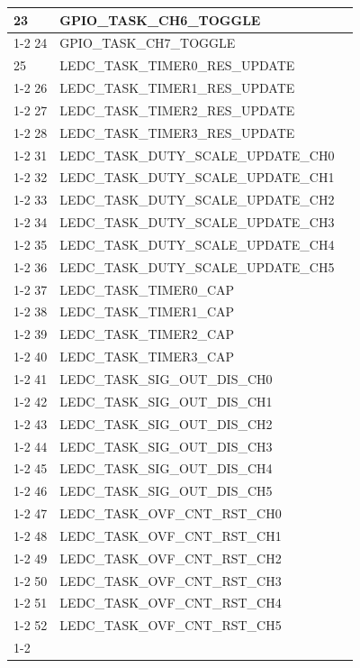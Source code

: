 \documentclass[main\_\_EN.tex]{subfiles}
\begin{document}
\begin{longtable}{ | l | l | l | }
23  & GPIO\_TASK\_CH6\_TOGGLE  &  \\ \cline{1-2}
24  & GPIO\_TASK\_CH7\_TOGGLE  &  \\ \hline
25  & LEDC\_TASK\_TIMER0\_RES\_UPDATE      & \nameref{mod:ledpwm} \\ \cline{1-2}
26  & LEDC\_TASK\_TIMER1\_RES\_UPDATE      & \\ \cline{1-2}
27  & LEDC\_TASK\_TIMER2\_RES\_UPDATE      & \\ \cline{1-2}
28  & LEDC\_TASK\_TIMER3\_RES\_UPDATE      & \\ \cline{1-2}
31  & LEDC\_TASK\_DUTY\_SCALE\_UPDATE\_CH0 & \\ \cline{1-2}
32  & LEDC\_TASK\_DUTY\_SCALE\_UPDATE\_CH1 & \\ \cline{1-2}
33  & LEDC\_TASK\_DUTY\_SCALE\_UPDATE\_CH2 & \\ \cline{1-2}
34  & LEDC\_TASK\_DUTY\_SCALE\_UPDATE\_CH3 & \\ \cline{1-2}
35  & LEDC\_TASK\_DUTY\_SCALE\_UPDATE\_CH4 & \\ \cline{1-2}
36  & LEDC\_TASK\_DUTY\_SCALE\_UPDATE\_CH5 & \\ \cline{1-2}
37  & LEDC\_TASK\_TIMER0\_CAP  & \\ \cline{1-2}
38  & LEDC\_TASK\_TIMER1\_CAP  & \\ \cline{1-2}
39  & LEDC\_TASK\_TIMER2\_CAP  & \\ \cline{1-2}
40  & LEDC\_TASK\_TIMER3\_CAP  & \\ \cline{1-2}
41  & LEDC\_TASK\_SIG\_OUT\_DIS\_CH0& \\ \cline{1-2}
42  & LEDC\_TASK\_SIG\_OUT\_DIS\_CH1& \\ \cline{1-2}
43  & LEDC\_TASK\_SIG\_OUT\_DIS\_CH2& \\ \cline{1-2}
44  & LEDC\_TASK\_SIG\_OUT\_DIS\_CH3& \\ \cline{1-2}
45  & LEDC\_TASK\_SIG\_OUT\_DIS\_CH4& \\ \cline{1-2}
46  & LEDC\_TASK\_SIG\_OUT\_DIS\_CH5& \\ \cline{1-2}
47  & LEDC\_TASK\_OVF\_CNT\_RST\_CH0& \\ \cline{1-2}
48  & LEDC\_TASK\_OVF\_CNT\_RST\_CH1& \\ \cline{1-2}
49  & LEDC\_TASK\_OVF\_CNT\_RST\_CH2& \\ \cline{1-2}
50  & LEDC\_TASK\_OVF\_CNT\_RST\_CH3& \\ \cline{1-2}
51  & LEDC\_TASK\_OVF\_CNT\_RST\_CH4& \\ \cline{1-2}
52  & LEDC\_TASK\_OVF\_CNT\_RST\_CH5& \\ \cline{1-2}

\end{longtable}
\end{document}
